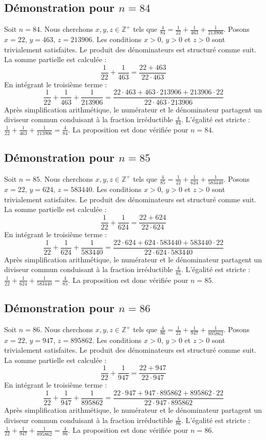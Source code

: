 \documentclass[11pt,a4paper]{article}
\begin{document}
\subsection{Démonstration pour $n = 84$}
Soit $n = 84$. Nous cherchons $x, y, z \in \mathbb{Z}^{+}$ tels que $\frac{4}{84} = \frac{1}{22} + \frac{1}{463} + \frac{1}{213906}$.
Posons $x = 22$, $y = 463$, $z = 213906$.
Les conditions $x > 0$, $y > 0$ et $z > 0$ sont trivialement satisfaites.
Le produit des dénominateurs est structuré comme suit. La somme partielle est calculée :
$$ \frac{1}{22} + \frac{1}{463} = \frac{22+463}{22 \cdot 463} $$
En intégrant le troisième terme :
$$ \frac{1}{22} + \frac{1}{463} + \frac{1}{213906} = \frac{22 \cdot 463 + 463 \cdot 213906 + 213906 \cdot 22}{22 \cdot 463 \cdot 213906} $$
Après simplification arithmétique, le numérateur et le dénominateur partagent un diviseur commun conduisant à la fraction irréductible $\frac{4}{84}$.
L'égalité est stricte : $\frac{1}{22} + \frac{1}{463} + \frac{1}{213906} = \frac{4}{84}$.
La proposition est donc vérifiée pour $n = 84$.
\subsection{Démonstration pour $n = 85$}
Soit $n = 85$. Nous cherchons $x, y, z \in \mathbb{Z}^{+}$ tels que $\frac{4}{85} = \frac{1}{22} + \frac{1}{624} + \frac{1}{583440}$.
Posons $x = 22$, $y = 624$, $z = 583440$.
Les conditions $x > 0$, $y > 0$ et $z > 0$ sont trivialement satisfaites.
Le produit des dénominateurs est structuré comme suit. La somme partielle est calculée :
$$ \frac{1}{22} + \frac{1}{624} = \frac{22+624}{22 \cdot 624} $$
En intégrant le troisième terme :
$$ \frac{1}{22} + \frac{1}{624} + \frac{1}{583440} = \frac{22 \cdot 624 + 624 \cdot 583440 + 583440 \cdot 22}{22 \cdot 624 \cdot 583440} $$
Après simplification arithmétique, le numérateur et le dénominateur partagent un diviseur commun conduisant à la fraction irréductible $\frac{4}{85}$.
L'égalité est stricte : $\frac{1}{22} + \frac{1}{624} + \frac{1}{583440} = \frac{4}{85}$.
La proposition est donc vérifiée pour $n = 85$.
\subsection{Démonstration pour $n = 86$}
Soit $n = 86$. Nous cherchons $x, y, z \in \mathbb{Z}^{+}$ tels que $\frac{4}{86} = \frac{1}{22} + \frac{1}{947} + \frac{1}{895862}$.
Posons $x = 22$, $y = 947$, $z = 895862$.
Les conditions $x > 0$, $y > 0$ et $z > 0$ sont trivialement satisfaites.
Le produit des dénominateurs est structuré comme suit. La somme partielle est calculée :
$$ \frac{1}{22} + \frac{1}{947} = \frac{22+947}{22 \cdot 947} $$
En intégrant le troisième terme :
$$ \frac{1}{22} + \frac{1}{947} + \frac{1}{895862} = \frac{22 \cdot 947 + 947 \cdot 895862 + 895862 \cdot 22}{22 \cdot 947 \cdot 895862} $$
Après simplification arithmétique, le numérateur et le dénominateur partagent un diviseur commun conduisant à la fraction irréductible $\frac{4}{86}$.
L'égalité est stricte : $\frac{1}{22} + \frac{1}{947} + \frac{1}{895862} = \frac{4}{86}$.
La proposition est donc vérifiée pour $n = 86$.
\end{document}
